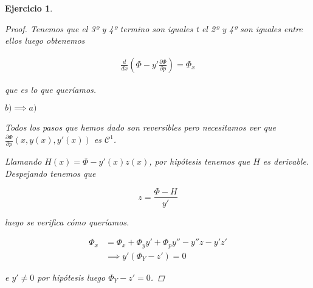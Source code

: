 \documentclass[12pt]{article}
\newtheorem{ejercicio}{Ejercicio}[section]
\theoremstyle{definition}
\theoremstyle{remark}
\begin{document}
\begin{ejercicio}
\begin{proof}
    Tenemos que el 3º y 4º termino son iguales t el 2º y 4º son
    iguales entre ellos luego obtenemos

        \begin{align*}
      \frac{d}{dx}(\Phi-y'\frac{\partial\Phi}{\partial p}) = \Phi_x
        \end{align*}

        que es lo que queríamos.

        $b)\implies a)$
        
        Todos los pasos que hemos dado son reversibles pero
        necesitamos ver que
        $\frac{\partial\Phi}{\partial p}(x, y(x), y'(x))$ es $\mathcal{C}^1$.

        Llamando $H(x) = \Phi-y'(x)z(x)$, por hipótesis tenemos que
        $H$ es derivable. Despejando tenemos que

        \[
          z = \frac{\Phi-H}{y'}
        \]

        luego se verifica cómo queríamos.

        \begin{align*}
          \Phi_x & = \Phi_x + \Phi_yy' + \Phi_py'' - y''z -y'z' \\
                 & \implies y'(\Phi_Y-z') = 0
        \end{align*}

        e $y' \neq 0$ por hipótesis luego $\Phi_Y - z' = 0$.
  \end{proof}
\end{ejercicio}
\end{document}
